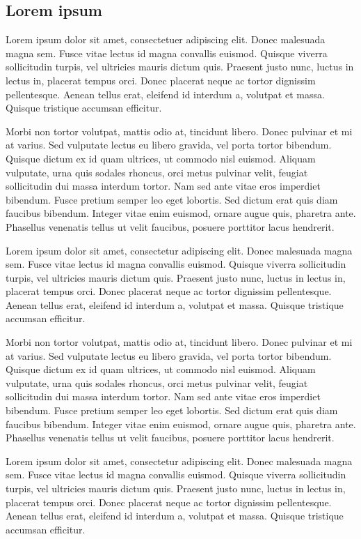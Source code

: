 \documentclass[b5paper]{scrbook}
\begin{document}
\clearpage
\subsection{Lorem ipsum}
Lorem ipsum dolor sit amet, consectetuer adipiscing elit.
Donec malesuada magna sem.
Fusce vitae lectus id magna convallis euismod.
Quisque viverra sollicitudin turpis, vel ultricies mauris dictum quis.
Praesent justo nunc, luctus in lectus in, placerat tempus orci.
Donec placerat neque ac tortor dignissim pellentesque.
Aenean tellus erat, eleifend id interdum a, volutpat et massa.
Quisque tristique accumsan efficitur.

Morbi non tortor volutpat, mattis odio at, tincidunt libero.
Donec pulvinar et mi at varius.
Sed vulputate lectus eu libero gravida, vel porta tortor bibendum.
Quisque dictum ex id quam ultrices, ut commodo nisl euismod.
Aliquam vulputate, urna quis sodales rhoncus, orci metus pulvinar velit, feugiat sollicitudin dui massa interdum tortor.
Nam sed ante vitae eros imperdiet bibendum.
Fusce pretium semper leo eget lobortis.
Sed dictum erat quis diam faucibus bibendum.
Integer vitae enim euismod, ornare augue quis, pharetra ante.
Phasellus venenatis tellus ut velit faucibus, posuere porttitor lacus hendrerit.

Lorem ipsum dolor sit amet, consectetur adipiscing elit.
Donec malesuada magna sem.
Fusce vitae lectus id magna convallis euismod.
Quisque viverra sollicitudin turpis, vel ultricies mauris dictum quis.
Praesent justo nunc, luctus in lectus in, placerat tempus orci.
Donec placerat neque ac tortor dignissim pellentesque.
Aenean tellus erat, eleifend id interdum a, volutpat et massa.
Quisque tristique accumsan efficitur.

Morbi non tortor volutpat, mattis odio at, tincidunt libero.
Donec pulvinar et mi at varius.
Sed vulputate lectus eu libero gravida, vel porta tortor bibendum.
Quisque dictum ex id quam ultrices, ut commodo nisl euismod.
Aliquam vulputate, urna quis sodales rhoncus, orci metus pulvinar velit, feugiat sollicitudin dui massa interdum tortor.
Nam sed ante vitae eros imperdiet bibendum.
Fusce pretium semper leo eget lobortis.
Sed dictum erat quis diam faucibus bibendum.
Integer vitae enim euismod, ornare augue quis, pharetra ante.
Phasellus venenatis tellus ut velit faucibus, posuere porttitor lacus hendrerit.

Lorem ipsum dolor sit amet, consectetur adipiscing elit.
Donec malesuada magna sem.
Fusce vitae lectus id magna convallis euismod.
Quisque viverra sollicitudin turpis, vel ultricies mauris dictum quis.
Praesent justo nunc, luctus in lectus in, placerat tempus orci.
Donec placerat neque ac tortor dignissim pellentesque.
Aenean tellus erat, eleifend id interdum a, volutpat et massa.
Quisque tristique accumsan efficitur.
\end{document}

